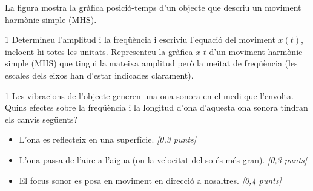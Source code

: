 La figura mostra la gràfica posició-temps d'un objecte que descriu un moviment harmònic simple (MHS).


\begin{apartat}{1}
Determineu l'amplitud i la freqüència i escriviu l'equació del moviment $x(t)$, incloent-hi totes les unitats. Representeu la gràfica $x$-$t$ d'un moviment harmònic simple (MHS) que tingui la mateixa amplitud però la meitat de freqüència (les escales dels eixos han d'estar indicades clarament).
\end{apartat}

\begin{apartat}{1}
Les vibracions de l'objecte generen una ona sonora en el medi que l'envolta. Quins efectes sobre la freqüència i la longitud d'ona d'aquesta ona sonora tindran els canvis següents?
\begin{itemize}
  \item[---] L'ona es reflecteix en una superfície. \hfill\textit{[0,3 punts]}
  \item[---] L'ona passa de l'aire a l'aigua (on la velocitat del so és més gran). \hfill\textit{[0,3 punts]}
  \item[---] El focus sonor es posa en moviment en direcció a nosaltres. \hfill\textit{[0,4 punts]}
\end{itemize}
\end{apartat}
